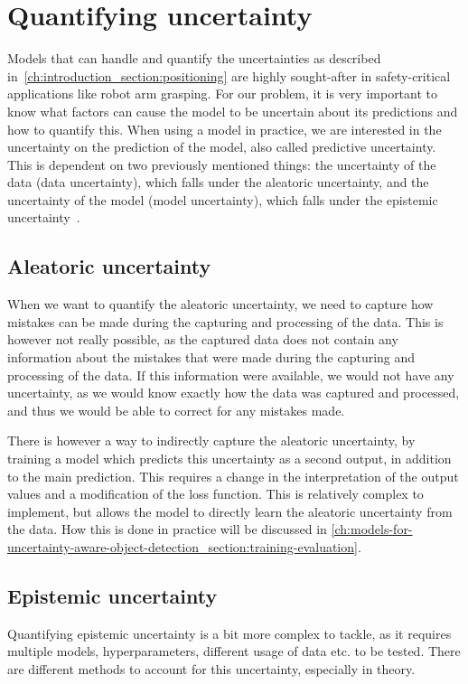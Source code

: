 \section{Quantifying uncertainty} \label{ch:literature-study_section:quantifying-uncertainty}
Models that can handle and quantify the uncertainties as described in~\cref{ch:introduction_section:positioning} are highly sought-after in safety-critical applications like robot arm grasping.
For our problem, it is very important to know what factors can cause the model to be uncertain about its predictions and how to quantify this.
When using a model in practice, we are interested in the uncertainty on the prediction of the model, also called predictive uncertainty.
This is dependent on two previously mentioned things: the uncertainty of the data (data uncertainty), which falls under the aleatoric uncertainty, and the uncertainty of the model (model uncertainty), which falls under the epistemic uncertainty~\cite{src:survey-uncertainty-dnn}.

\subsection{Aleatoric uncertainty} \label{ch:literature-study_section:quantifying-uncertainty_subsection:aleatoric-uncertainty}
When we want to quantify the aleatoric uncertainty, we need to capture how mistakes can be made during the capturing and processing of the data.
This is however not really possible, as the captured data does not contain any information about the mistakes that were made during the capturing and processing of the data.
If this information were available, we would not have any uncertainty, as we would know exactly how the data was captured and processed, and thus we would be able to correct for any mistakes made.

There is however a way to indirectly capture the aleatoric uncertainty, by training a model which predicts this uncertainty as a second output, in addition to the main prediction.
This requires a change in the interpretation of the output values and a modification of the loss function.
This is relatively complex to implement, but allows the model to directly learn the aleatoric uncertainty from the data.
How this is done in practice will be discussed in \cref{ch:models-for-uncertainty-aware-object-detection_section:training-evaluation}.

\subsection{Epistemic uncertainty} \label{ch:literature-study_section:quantifying-uncertainty_subsection:epistemic-uncertainty}
Quantifying epistemic uncertainty is a bit more complex to tackle, as it requires multiple models, hyperparameters, different usage of data etc. to be tested.
There are different methods to account for this uncertainty, especially in theory.

